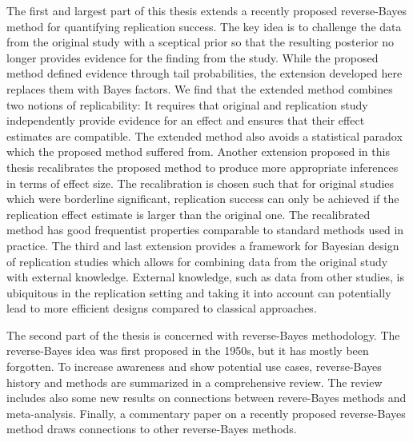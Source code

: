 The first and largest part of this thesis extends a recently proposed
reverse-Bayes method for quantifying replication success. The key idea is to
challenge the data from the original study with a sceptical prior so that the
resulting posterior no longer provides evidence for the finding from the study.
While the proposed method defined evidence through tail probabilities, the
extension developed here replaces them with Bayes
factors. %
We find that the extended method combines two notions of replicability: It
requires that original and replication study independently provide evidence for
an effect and ensures that their effect estimates are compatible. The extended
method also avoids a statistical paradox which the proposed method suffered
from.
Another extension proposed in this thesis recalibrates the proposed method to
produce more appropriate inferences in terms of effect
size. %
The recalibration is chosen such that for original studies which were borderline
significant, replication success can only be achieved if the replication effect
estimate is larger than the original one. The recalibrated method has good
frequentist properties comparable to standard methods used in practice. The
third and last extension provides a framework for Bayesian design of replication
studies which allows for combining data from the original study with external
knowledge. External knowledge, such as data from other studies, is ubiquitous in
the replication setting and taking it into account can potentially lead to more
efficient designs compared to classical approaches.

The second part of the thesis is concerned with reverse-Bayes methodology. The
reverse-Bayes idea was first proposed in the 1950s, but it has mostly been
forgotten. To increase awareness and show potential use cases, reverse-Bayes
history and methods are summarized in a comprehensive review. The review
includes also some new results on connections between revere-Bayes methods and
meta-analysis. Finally, a commentary paper on a recently proposed reverse-Bayes
method draws connections to other reverse-Bayes methods.

